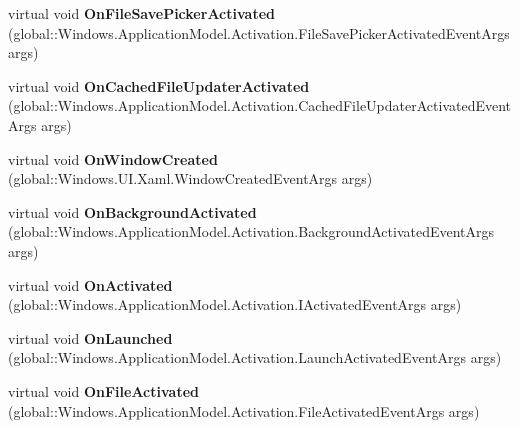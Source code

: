 \begin{DoxyCompactItemize}
\mbox{\label{class_windows_1_1_u_i_1_1_xaml_1_1_application_ac08cc52e93ef57a27360f3cb1ae256c4}} 
virtual void {\bfseries On\+File\+Save\+Picker\+Activated} (global\+::\+Windows.\+Application\+Model.\+Activation.\+File\+Save\+Picker\+Activated\+Event\+Args args)
\item 
\mbox{\label{class_windows_1_1_u_i_1_1_xaml_1_1_application_a7f572e2107540b33cb772a84ddd7ec72}} 
virtual void {\bfseries On\+Cached\+File\+Updater\+Activated} (global\+::\+Windows.\+Application\+Model.\+Activation.\+Cached\+File\+Updater\+Activated\+Event\+Args args)
\item 
\mbox{\label{class_windows_1_1_u_i_1_1_xaml_1_1_application_a69d851136f5764f6fb1d953b4447219f}} 
virtual void {\bfseries On\+Window\+Created} (global\+::\+Windows.\+U\+I.\+Xaml.\+Window\+Created\+Event\+Args args)
\item 
\mbox{\label{class_windows_1_1_u_i_1_1_xaml_1_1_application_a99448e12dcdd4516781f0aba248db35e}} 
virtual void {\bfseries On\+Background\+Activated} (global\+::\+Windows.\+Application\+Model.\+Activation.\+Background\+Activated\+Event\+Args args)
\item 
\mbox{\label{class_windows_1_1_u_i_1_1_xaml_1_1_application_a1007269442b51bcb8b6f72fb5c538c4d}} 
virtual void {\bfseries On\+Activated} (global\+::\+Windows.\+Application\+Model.\+Activation.\+I\+Activated\+Event\+Args args)
\item 
\mbox{\label{class_windows_1_1_u_i_1_1_xaml_1_1_application_ac34abc539f620025d7e6026118ec1fb9}} 
virtual void {\bfseries On\+Launched} (global\+::\+Windows.\+Application\+Model.\+Activation.\+Launch\+Activated\+Event\+Args args)
\item 
\mbox{\label{class_windows_1_1_u_i_1_1_xaml_1_1_application_ad3a115248881604e559640ff7d3f1510}} 
virtual void {\bfseries On\+File\+Activated} (global\+::\+Windows.\+Application\+Model.\+Activation.\+File\+Activated\+Event\+Args args)

\end{DoxyCompactItemize}
